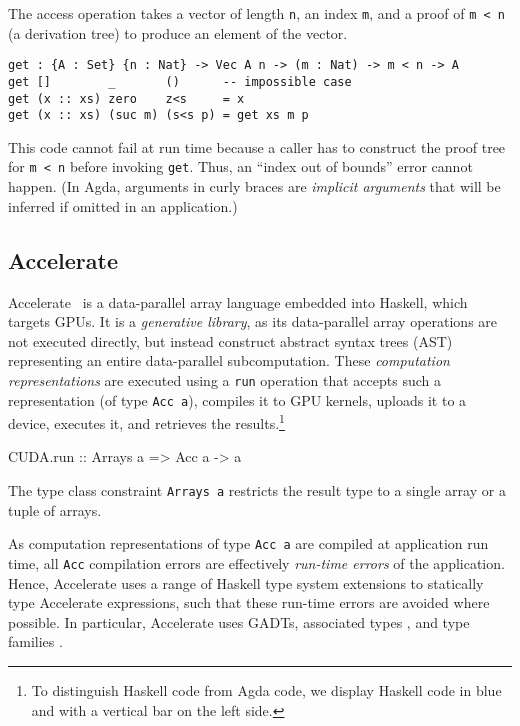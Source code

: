 \documentclass{llncs}
\begin{document}
The access operation takes a vector of length \verb+n+, an index
\verb+m+, and a proof of \verb+m < n+ (a derivation tree) to produce
an element of the vector.  
\begin{verbatim}
get : {A : Set} {n : Nat} -> Vec A n -> (m : Nat) -> m < n -> A
get []        _       ()      -- impossible case
get (x :: xs) zero    z<s     = x
get (x :: xs) (suc m) (s<s p) = get xs m p
\end{verbatim}
This code cannot fail at run time because a caller has to
construct the proof tree for \verb+m < n+ before invoking
\verb+get+. Thus, an ``index out of bounds'' error cannot happen. 
(In Agda, arguments in curly braces are \emph{implicit
  arguments} that will be inferred if omitted in an application.)

\subsection{Accelerate}
\label{sec:accelerate}

Accelerate~\cite{ChakravartyKellerLeeMcdonellGrover2011} is a
data-parallel array language embedded into Haskell, which targets
GPUs. It is a \emph{generative library}, as its data-parallel array
operations are not executed directly, but instead construct abstract
syntax trees (AST) representing an entire data-parallel
subcomputation. These \emph{computation representations} are executed
using a \verb+run+ operation that accepts such a representation (of type
\verb+Acc a+), compiles it to GPU kernels, uploads it to a device,
executes it, and retrieves the results.\footnote{To distinguish
  Haskell code from Agda code, we display Haskell code in blue and with
  a vertical bar on the left side.}
%
\begin{hcode}
CUDA.run :: Arrays a => Acc a -> a
\end{hcode}
%
The type class constraint \verb+Arrays a+ restricts the result type to a single array or a tuple of arrays.

As computation representations of type \verb+Acc a+ are compiled at
application run time, all \verb+Acc+ compilation errors are effectively \emph{run-time errors} of the application. Hence, Accelerate uses a range of Haskell type system extensions to statically type Accelerate expressions, such that these run-time errors are avoided where possible. In particular, Accelerate uses GADTs\cite{PeytonJonesVytiniotisWeirichWashburn2006}, associated types
\cite{ChakravartyKellerJones2005}, and type families
\cite{SchrijversPeytonJonesChakravartySulzmann2008}. 
\end{document}
